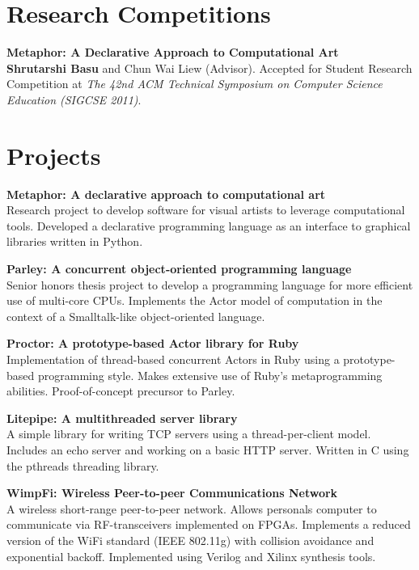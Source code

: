\documentclass[margin,line]{resume}
\begin{document}
\begin{resume}
    \section{Research Competitions}
    {\bf Metaphor: A Declarative Approach to Computational Art} \\
    {\bf Shrutarshi Basu} and Chun Wai Liew (Advisor). 
    Accepted for Student Research Competition at \emph{The 42nd ACM Technical
      Symposium on Computer Science Education (SIGCSE 2011)}.

    \section{Projects}
    {\bf Metaphor: A declarative approach to computational art}\\
    Research project to develop software for visual artists to leverage
    computational tools. Developed a declarative programming language as an
    interface to graphical libraries written in Python.

    {\bf Parley: A concurrent object-oriented programming language}\\
    Senior honors thesis project to develop a programming language for more
    efficient use of multi-core CPUs. Implements the Actor model of computation
    in the context of a Smalltalk-like object-oriented language.

    {\bf Proctor: A prototype-based Actor library for Ruby} \\
    Implementation of thread-based concurrent Actors in Ruby using a
    prototype-based programming style. Makes extensive use of Ruby's
    metaprogramming abilities. Proof-of-concept precursor to Parley.

    {\bf Litepipe: A multithreaded server library} \\
    A simple library for writing TCP servers using a thread-per-client
    model. Includes an echo server and working on a basic HTTP server. Written
    in C using the pthreads threading library.

    {\bf WimpFi: Wireless Peer-to-peer Communications Network}\\
    A wireless short-range peer-to-peer network. Allows personals computer to
    communicate via RF-transceivers implemented on FPGAs. Implements a reduced
    version of the WiFi standard (IEEE 802.11g) with collision avoidance and
    exponential backoff. Implemented using Verilog and Xilinx synthesis tools.


\end{resume}
\end{document}
